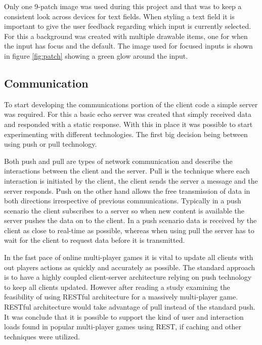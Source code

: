 Only one 9-patch image was used during this project and that was to keep a consistent look across devices for text fields. When styling a text field it is important to give the user feedback regarding which input is currently selected. For this a background was created with multiple drawable items, one for when the input has focus and the default. The image used for focused inputs is shown in figure \ref{fig:patch} showing a green glow around the input.

\subsection{Communication}
To start developing the communications portion of the client code a simple server was required. For this a basic echo server was created that simply received data and responded with a static response. With this in place it was possible to start experimenting with different technologies. The first big decision being between using push or pull technology.

Both push and pull are types of network communication and describe the interactions between the client and the server. Pull is the technique where each interaction is initiated by the client, the client sends the server a message and the server responds. Push on the other hand allows the free transmission of data in both directions irrespective of previous communications. Typically in a push scenario the client subscribes to a server so when new content is available the server pushes the data on to the client. In a push scenario data is received by the client as close to real-time as possible, whereas when using pull the server has to wait for the client to request data before it is transmitted.

In the fast pace of online multi-player games it is vital to update all clients with out players actions as quickly and accurately as possible. The standard approach is to have a highly coupled client-server architecture relying on push technology to keep all clients updated. However after reading a study\cite{6329833} examining the feasibility of using RESTful architecture for a massively multi-player game. RESTful architecture would take advantage of pull instead of the standard push. It was conclude that it is possible to support the kind of user and interaction loads found in popular multi-player games using REST, if caching and other techniques were utilized.

